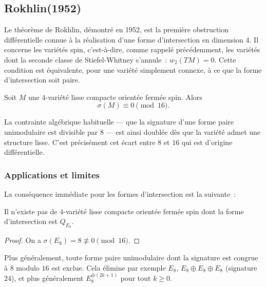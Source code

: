 
\subsection{Rokhlin(1952)}

Le théorème de Rokhlin, démontré en 1952, est la première obstruction différentielle connue
à la réalisation d'une forme d'intersection en dimension $4$. Il concerne les variétés spin,
c'est-à-dire, comme rappelé précédemment, les variétés dont la seconde classe de
Stiefel-Whitney s'annule~: $w_2(TM) = 0$. Cette condition est équivalente, pour une variété
simplement connexe, à ce que la forme d'intersection soit paire.

\begin{theorem}[Rokhlin, 1952]\label{thm:rokhlin}
  Soit $M$ une $4$-variété lisse compacte orientée fermée spin. Alors
  \[
    \sigma(M) \equiv 0 \pmod{16}.
\]
\end{theorem}

La contrainte algébrique habituelle — que la signature d'une forme paire unimodulaire est
divisible par $8$ — est ainsi doublée dès que la variété admet une structure lisse. C'est
précisément cet écart entre $8$ et $16$ qui est d'origine différentielle.

\subsubsection*{Applications et limites}

La conséquence immédiate pour les formes d'intersection est la suivante~:

\begin{corollary}\label{cor:rokhlin_e8}
  Il n'existe pas de $4$-variété lisse compacte orientée fermée spin dont la forme
  d'intersection est $Q_{E_8}$.
\end{corollary}

\begin{proof}
  On a $\sigma(E_8) = 8 \not\equiv 0 \pmod{16}$.
\end{proof}

Plus généralement, toute forme paire unimodulaire dont la signature est congrue à $8$ modulo
$16$ est exclue. Cela élimine par exemple $E_8$, $E_8 \oplus E_8 \oplus E_8$ (signature
$24$), et plus généralement $E_8^{\oplus (2k+1)}$ pour tout $k \geq 0$.

